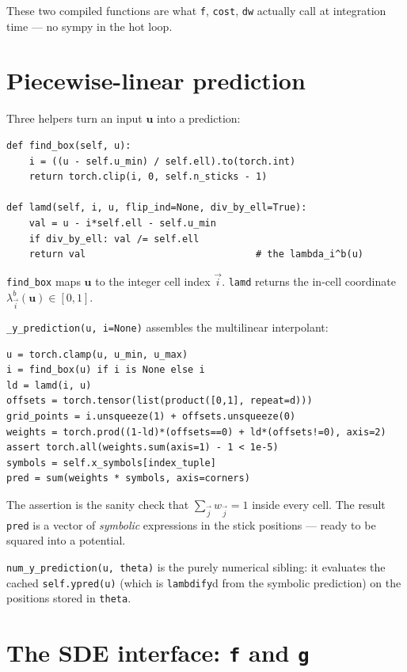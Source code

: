 \documentclass[11pt]{article}
\newcommand{\uv}{\mathbf{u}}
\newcommand{\code}[1]{\texttt{\small #1}}
\begin{document}
These two compiled functions are what \code{f}, \code{cost}, \code{dw} actually call at integration time --- no sympy in the hot loop.

\section{Piecewise-linear prediction}\label{sec:pwlin}

Three helpers turn an input $\uv$ into a prediction:

\begin{lstlisting}
def find_box(self, u):
    i = ((u - self.u_min) / self.ell).to(torch.int)
    return torch.clip(i, 0, self.n_sticks - 1)

def lamd(self, i, u, flip_ind=None, div_by_ell=True):
    val = u - i*self.ell - self.u_min
    if div_by_ell: val /= self.ell
    return val                              # the lambda_i^b(u)
\end{lstlisting}

\code{find\_box} maps $\uv$ to the integer cell index $\vec i$. \code{lamd} returns the in-cell coordinate $\lambda_{\vec i}^b(\uv) \in [0,1]$.

\code{\_y\_prediction(u, i=None)} assembles the multilinear interpolant:
\begin{lstlisting}
u = torch.clamp(u, u_min, u_max)
i = find_box(u) if i is None else i
ld = lamd(i, u)
offsets = torch.tensor(list(product([0,1], repeat=d)))
grid_points = i.unsqueeze(1) + offsets.unsqueeze(0)
weights = torch.prod((1-ld)*(offsets==0) + ld*(offsets!=0), axis=2)
assert torch.all(weights.sum(axis=1) - 1 < 1e-5)
symbols = self.x_symbols[index_tuple]
pred = sum(weights * symbols, axis=corners)
\end{lstlisting}

The assertion is the sanity check that $\sum_{\vec j} w_{\vec j} = 1$ inside every cell. The result \code{pred} is a vector of \emph{symbolic} expressions in the stick positions --- ready to be squared into a potential.

\code{num\_y\_prediction(u, theta)} is the purely numerical sibling: it evaluates the cached \code{self.ypred(u)} (which is \code{lambdify}d from the symbolic prediction) on the positions stored in \code{theta}.

\section{The SDE interface: \texttt{f} and \texttt{g}}
\end{document}
